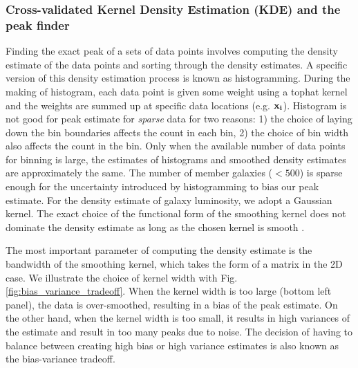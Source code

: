\subsubsection{Cross-validated Kernel Density Estimation (KDE) and the peak finder} 
\label{subsubsec:KDE}
Finding the exact peak of a sets of data points 
involves computing the density estimate of the data points and sorting through
the density estimates. A specific version of this density estimation process is
known as histogramming. During the making of histogram, each data point is
given some weight using a tophat kernel and the weights are summed up at
specific data locations (e.g. $\bf{x}_i$). 
Histogram is not good for peak estimate for {\it sparse} data for two reasons: 1) the
choice of laying down the bin boundaries affects the count in each bin, 2) the choice of
bin width also affects the count in the bin. Only when the available number of data points
for binning is large, the estimates of histograms and smoothed density
estimates are approximately the same. The number of member galaxies ($< 500$) 
is sparse enough for the uncertainty introduced by histogramming to bias our
peak estimate. For the density estimate of galaxy luminosity, 
we adopt a Gaussian kernel. 
The exact choice of the functional form of the smoothing kernel does
not dominate the density estimate as long as the chosen kernel is
smooth \citep{Feigelson2014}. 

The most important parameter of computing the density estimate is the bandwidth
 of the smoothing kernel, which takes the form of a matrix in the 2D case. 
 We illustrate the choice of kernel width with Fig.
\ref{fig:bias_variance_tradeoff}. When the kernel width is
too large (bottom left panel), the data is over-smoothed, 
resulting in a bias of the peak estimate. On the other hand, when the kernel
width is too small, it results in high variances of the estimate and result in
too many peaks due to noise. The decision of having to balance between creating high
bias or high variance estimates is also known as the bias-variance tradeoff. 

